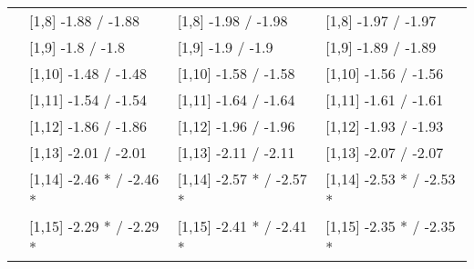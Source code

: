 \begin{table}
\begin{tabular}[t]{llll}
\addlinespace
500 & {}[1,8] -1.88  / -1.88 & {}[1,8] -1.98  / -1.98 & {}[1,8] -1.97  / -1.97\\
 & {}[1,9] -1.8  / -1.8 & {}[1,9] -1.9  / -1.9 & {}[1,9] -1.89  / -1.89\\
 & {}[1,10] -1.48  / -1.48 & {}[1,10] -1.58  / -1.58 & {}[1,10] -1.56  / -1.56\\
 & {}[1,11] -1.54  / -1.54 & {}[1,11] -1.64  / -1.64 & {}[1,11] -1.61  / -1.61\\
 & {}[1,12] -1.86  / -1.86 & {}[1,12] -1.96  / -1.96 & {}[1,12] -1.93  / -1.93\\
\addlinespace
 & {}[1,13] -2.01  / -2.01 & {}[1,13] -2.11  / -2.11 & {}[1,13] -2.07  / -2.07\\
 & {}[1,14] -2.46 * / -2.46 * & {}[1,14] -2.57 * / -2.57 * & {}[1,14] -2.53 * / -2.53 *\\
 & {}[1,15] -2.29 * / -2.29 * & {}[1,15] -2.41 * / -2.41 * & {}[1,15] -2.35 * / -2.35 *\\
\bottomrule
\end{tabular}
\end{table}
